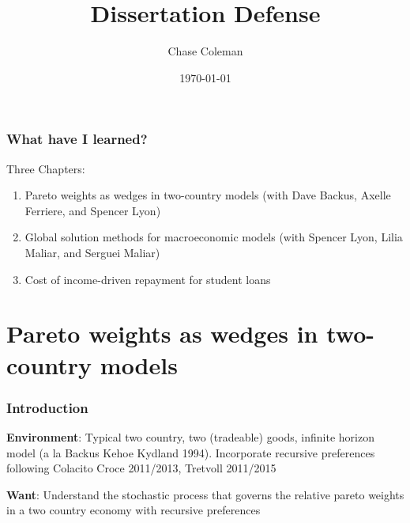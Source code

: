 \documentclass[10pt]{beamer}
\title{Dissertation Defense}
\author{Chase Coleman}
\institute{NYU Stern}
\date[]{\today}
\begin{document}
\begin{frame}
  \thispagestyle{empty}
  \titlepage
\end{frame}

\begin{frame} \frametitle{What have I learned?}

  Three Chapters:

  \vspace{0.5cm}

  \begin{enumerate}
    \item Pareto weights as wedges in two-country models (with Dave Backus, Axelle Ferriere,
          and Spencer Lyon)
    \item Global solution methods for macroeconomic models (with Spencer Lyon, Lilia Maliar, and
          Serguei Maliar)
    \item Cost of income-driven repayment for student loans
  \end{enumerate}

\end{frame}

\section{Pareto weights as wedges in two-country models}

  \begin{frame} \frametitle{Introduction}

    \textbf{Environment}: Typical two country, two (tradeable) goods, infinite horizon model (a la
    Backus Kehoe Kydland 1994). Incorporate recursive preferences following Colacito Croce
    2011/2013, Tretvoll 2011/2015

    \vspace{0.5cm}

    \textbf{Want}: Understand the stochastic process that governs the relative pareto weights in a
    two country economy with recursive preferences

  \end{frame}
\end{document}
